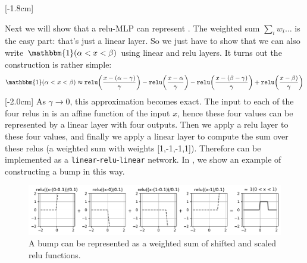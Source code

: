 [-1.8cm]

Next we will show that a relu-MLP can represent \eqn{\ref{eqn:neural_nets:sum_of_indicators}}. The weighted sum $\sum_i w_i \ldots$ is the easy part: that's just a linear layer. So we just have to show that we can also write $\mathbbm{1}(\alpha < x < \beta)$ using linear and relu layers. It turns out the construction is rather simple:
\begin{align}
\mathbbm{1}(\alpha < x < \beta) \approx \texttt{relu}\bigg(\frac{x-(\alpha-\gamma)}{\gamma}\bigg) - \texttt{relu}\bigg(\frac{x-\alpha}{\gamma}\bigg) - \texttt{relu}\bigg(\frac{x-(\beta-\gamma)}{\gamma}\bigg) + \texttt{relu}\bigg(\frac{x-\beta)}{\gamma}\bigg) \label{eqn:neural_nets:bump_as_relu_net}
\end{align}
[-2.0cm]
As $\gamma \rightarrow 0$, this approximation becomes exact. The input to each of the four relus in \eqn{\ref{eqn:neural_nets:bump_as_relu_net}} is an affine function of the input $x$, hence these four values can be represented by a linear layer with four outputs. Then we apply a relu layer to these four values, and finally we apply a linear layer to compute the sum over these relus (a weighted sum with weights [1,-1,-1,1]). Therefore \eqn{\ref{eqn:neural_nets:bump_as_relu_net}} can be implemented as a \texttt{linear}-\texttt{relu}-\texttt{linear} network. In \fig{\ref{fig:neural_nets:bump_as_relus}}, we show an example of constructing a bump in this way.
\begin{figure}[h]
    \centerline{
    \includegraphics[width=1.0\linewidth]{./figures/neural_nets/bump_as_relus.pdf}
    }
    \caption{A bump can be represented as a weighted sum of shifted and scaled relu functions.}
    \label{fig:neural_nets:bump_as_relus}
\end{figure}


